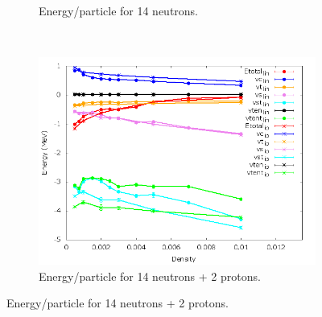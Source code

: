 \documentclass[12pt]{article}
\begin{document}
\begin{figure}[h!]
\begin{subfigure}{0.49\textwidth}
      \caption{Energy/particle for 14 neutrons.}
   \end{subfigure}
   ~
   \begin{subfigure}{0.49\textwidth}
      \includegraphics[width=\textwidth]{../av6_14n2p_linVSip.png}
      \caption{Energy/particle for 14 neutrons + 2 protons.}
   \end{subfigure}
\end{figure}
\newpage



\clearpage


\end{document}
